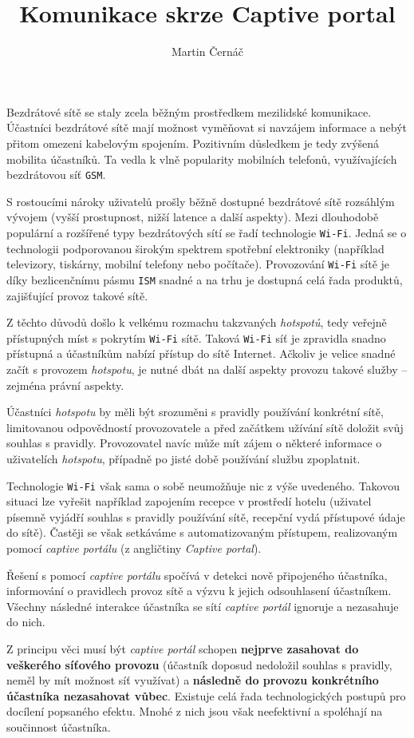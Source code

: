 \documentclass[thesis=M,czech]{FITthesis}[2012/10/20]
\title{Komunikace skrze Captive portal}
\author{Martin Černáč} %
\begin{document}
\begin{introduction}
Bezdrátové sítě se staly zcela běžným prostředkem mezilidské komunikace. Účastníci bezdrátové sítě mají možnost vyměňovat si navzájem informace a nebýt přitom omezeni kabelovým spojením. Pozitivním důsledkem je tedy zvýšená mobilita účastníků. Ta vedla k vlně popularity mobilních telefonů, využívajících bezdrátovou síť \texttt{GSM}.

S rostoucími nároky uživatelů prošly běžně dostupné bezdrátové sítě rozsáhlým vývojem (vyšší prostupnost, nižší latence a další aspekty). Mezi dlouhodobě populární a rozšířené typy bezdrátových sítí se řadí technologie \texttt{Wi-Fi}. Jedná se o technologii podporovanou širokým spektrem spotřební elektroniky (například televizory, tiskárny, mobilní telefony nebo počítače). Provozování \texttt{Wi-Fi} sítě je díky bezlicenčnímu pásmu \texttt{ISM} snadné a na trhu je dostupná celá řada produktů, zajišťující provoz takové sítě.

Z těchto důvodů došlo k velkému rozmachu takzvaných \textit{hotspotů}, tedy veřejně přístupných míst s pokrytím \texttt{Wi-Fi} sítě. Taková \texttt{Wi-Fi} síť je zpravidla snadno přístupná a účastníkům nabízí přístup do sítě Internet. Ačkoliv je velice snadné začít s provozem \textit{hotspotu}, je nutné dbát na další aspekty provozu takové služby -- zejména právní aspekty.

Účastníci \textit{hotspotu} by měli být srozuměni s pravidly používání konkrétní sítě, limitovanou odpovědností provozovatele a před začátkem užívání sítě doložit svůj souhlas s pravidly. Provozovatel navíc může mít zájem o některé informace o uživatelích \textit{hotspotu}, případně po jisté době používání službu zpoplatnit.

Technologie \texttt{Wi-Fi} však sama o sobě neumožňuje nic z výše uvedeného. Takovou situaci lze vyřešit například zapojením recepce v prostředí hotelu (uživatel písemně vyjádří souhlas s pravidly používání sítě, recepční vydá přístupové údaje do sítě). Častěji se však setkáváme s automatizovaným přístupem, realizovaným pomocí \textit{captive portálu} (z angličtiny \textit{Captive portal}).

Řešení s pomocí \textit{captive portálu} spočívá v detekci nově připojeného účastníka, informování o pravidlech provoz sítě a výzvu k jejich odsouhlasení účastníkem. Všechny následné interakce účastníka se sítí \textit{captive portál} ignoruje a nezasahuje do nich.

Z principu věci musí být \textit{captive portál} schopen \textbf{nejprve zasahovat do veškerého síťového provozu} (účastník doposud nedoložil souhlas s pravidly, neměl by mít možnost síť využívat) a \textbf{následně do provozu konkrétního účastníka nezasahovat vůbec}. Existuje celá řada technologických postupů pro docílení popsaného efektu. Mnohé z nich jsou však neefektivní a spoléhají na součinnost účastníka.


\end{introduction}
\end{document}
